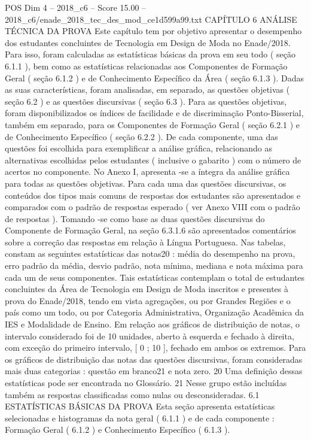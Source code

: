 \begin{textsample}{POS Dim 4 – 2018\_c6 – Score 15.00 – 2018\_c6/enade\_2018\_tec\_des\_mod\_ce1d599a99.txt}  \label{ex:f4_pos_002}
CAPÍTULO 6 ANÁLISE TÉCNICA DA PROVA Este capítulo tem por objetivo apresentar o desempenho dos estudantes concluintes de Tecnologia em Design de Moda no Enade/2018.
Para isso, foram calculadas as estatísticas básicas da prova em seu todo ( seção 6.1.1 ), bem como as estatísticas relacionadas aos Componentes de Formação Geral ( seção 6.1.2 ) e de Conhecimento Específico da Área ( seção 6.1.3 ).
Dadas as suas características, foram analisadas, em separado, as questões objetivas ( seção 6.2 ) e as questões discursivas ( seção 6.3 ).
Para as questões objetivas, foram disponibilizados os índices de facilidade e de discriminação Ponto-Bisserial, também em separado, para os Componentes de Formação Geral ( seção 6.2.1 ) e de Conhecimento Específico ( seção 6.2.2 ).
De cada componente, uma das questões foi escolhida para exemplificar a análise gráfica, relacionando as alternativas escolhidas pelos estudantes ( inclusive o gabarito ) com o número de acertos no componente.
No Anexo I, apresenta -se a íntegra da análise gráfica para todas as questões objetivas.
Para cada uma das questões discursivas, os conteúdos dos tipos mais comuns de respostas dos estudantes são apresentados e comparados com o padrão de respostas esperado ( ver Anexo VIII com o padrão de respostas ).
Tomando -se como base as duas questões discursivas do Componente de Formação Geral, na seção 6.3.1.6 são apresentados comentários sobre a correção das respostas em relação à Língua Portuguesa.
Nas tabelas, constam as seguintes estatísticas das notas20 : média do desempenho na prova, erro padrão da média, desvio padrão, nota mínima, mediana e nota máxima para cada um de seus componentes.
Tais estatísticas contemplam o total de estudantes concluintes da Área de Tecnologia em Design de Moda inscritos e presentes à prova do Enade/2018, tendo em vista agregações, ou por Grandes Regiões e o país como um todo, ou por Categoria Administrativa, Organização Acadêmica da IES e Modalidade de Ensino.
Em relação aos gráficos de distribuição de notas, o intervalo considerado foi de 10 unidades, aberto à esquerda e fechado à direita, com exceção do primeiro intervalo, [ 0 ; 10 ], fechado em ambos os extremos.
Para os gráficos de distribuição das notas das questões discursivas, foram consideradas mais duas categorias : questão em branco21 e nota zero. 20 Uma definição dessas estatísticas pode ser encontrada no Glossário. 21 Nesse grupo estão incluídas também as respostas classificadas como nulas ou desconsideradas. 6.1 ESTATÍSTICAS BÁSICAS DA PROVA Esta seção apresenta estatísticas selecionadas e histogramas da nota geral ( 6.1.1 ) e de cada componente : Formação Geral ( 6.1.2 ) e Conhecimento Específico ( 6.1.3 ).

\end{textsample}
